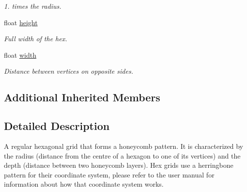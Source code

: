 \begin{DoxyCompactItemize}
\begin{DoxyCompactList}\small\item\em 1. times the radius.\end{DoxyCompactList}\item 
float \hyperlink{class_g_f_hex_grid_adef19e30b8a5c7e243d1f8239e270630_adef19e30b8a5c7e243d1f8239e270630}{height}
\begin{DoxyCompactList}\small\item\em Full width of the hex.\end{DoxyCompactList}\item 
float \hyperlink{class_g_f_hex_grid_a6d9ef76fc36e9b3709feb605219672a7_a6d9ef76fc36e9b3709feb605219672a7}{width}
\begin{DoxyCompactList}\small\item\em Distance between vertices on opposite sides.\end{DoxyCompactList}\end{DoxyCompactItemize}
\subsection*{Additional Inherited Members}


\subsection{Detailed Description}
A regular hexagonal grid that forms a honeycomb pattern. It is characterized by the {\ttfamily radius} (distance from the centre of a hexagon to one of its vertices) and the {\ttfamily depth} (distance between two honeycomb layers). Hex grids use a herringbone pattern for their coordinate system, please refer to the user manual for information about how that coordinate system works. 

